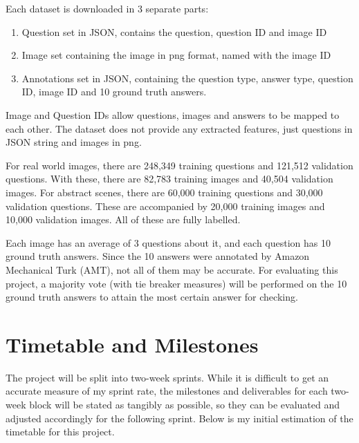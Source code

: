 \documentclass[12pt,a4paper,twoside]{article}
\begin{document}
Each dataset is downloaded in 3 separate parts:
\setlength{\parskip}{0em}
\begin{enumerate}
	\item  Question set in JSON, contains the question, question ID and image ID
	\item Image set containing the image in png format, named with the image ID
	\item Annotations set in JSON, containing the question type, answer type, question ID, image ID and 10 ground truth answers.
\end{enumerate}
Image and Question IDs allow questions, images and answers to be mapped to each other.
The dataset does not provide any extracted features, just questions in JSON string and images in png.
\setlength{\parskip}{1em}

For real world images, there are 248,349 training questions and 121,512 validation questions. With these, there are 82,783 training images and 40,504 validation images. For abstract scenes, there are 60,000 training questions and 30,000 validation questions. These are accompanied by 20,000 training images and 10,000 validation images. All of these are fully labelled.

Each image has an average of 3 questions about it, and each question has 10 ground truth answers. Since the 10 answers were annotated by Amazon Mechanical Turk (AMT), not all of them may be accurate. For evaluating this project, a majority vote (with tie breaker measures) will be performed on the 10 ground truth answers to attain the most certain answer for checking. 

\section{Timetable and Milestones}

The project will be split into two-week sprints. While it is difficult to get an accurate measure of my sprint rate, the milestones and deliverables for each two-week block will be stated as tangibly as possible, so they can be evaluated and adjusted accordingly for the following sprint. Below is my initial estimation of the timetable for this project.

\setlength{\parskip}{1em}
\renewcommand\labelitemi{\textasteriskcentered}
\end{document}
